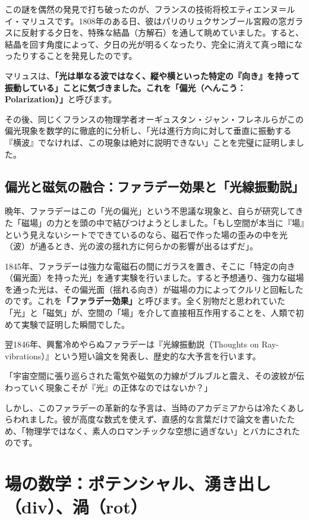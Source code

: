 この謎を偶然の発見で打ち破ったのが、フランスの技術将校エティエンヌ＝ルイ・マリュスです。1808年のある日、彼はパリのリュクサンブール宮殿の窓ガラスに反射する夕日を、特殊な結晶（方解石）を通して眺めていました。すると、結晶を回す角度によって、夕日の光が明るくなったり、完全に消えて真っ暗になったりすることを発見したのです。

マリュスは、\textbf{「光は単なる波ではなく、縦や横といった特定の『向き』を持って振動している」ことに気づきました。これを「偏光（へんこう：Polarization）」}と呼びます。

その後、同じくフランスの物理学者オーギュスタン・ジャン・フレネルらがこの偏光現象を数学的に徹底的に分析し、「光は進行方向に対して垂直に振動する『横波』でなければ、この現象は絶対に説明できない」ことを完璧に証明しました。

\subsection{偏光と磁気の融合：ファラデー効果と「光線振動説」}

晩年、ファラデーはこの「光の偏光」という不思議な現象と、自らが研究してきた「磁場」の力とを頭の中で結びつけようとしました。「もし空間が本当に『場』という見えないシートでできているのなら、磁石で作った場の歪みの中を光（波）が通るとき、光の波の揺れ方に何らかの影響が出るはずだ」。

1845年、ファラデーは強力な電磁石の間にガラスを置き、そこに「特定の向き（偏光面）を持った光」を通す実験を行いました。すると予想通り、強力な磁場を通った光は、その偏光面（揺れる向き）が磁場の力によってクルリと回転したのです。これを\textbf{「ファラデー効果」}と呼びます。全く別物だと思われていた「光」と「磁気」が、空間の「場」を介して直接相互作用することを、人類で初めて実験で証明した瞬間でした。

翌1846年、興奮冷めやらぬファラデーは『光線振動説（Thoughts on Ray-vibrations）』という短い論文を発表し、歴史的な大予言を行います。

「宇宙空間に張り巡らされた電気や磁気の力線がブルブルと震え、その波紋が伝わっていく現象こそが『光』の正体なのではないか？」

しかし、このファラデーの革新的な予言は、当時のアカデミアからは冷たくあしらわれました。彼が高度な数式を使えず、直感的な言葉だけで論文を書いたため、「物理学ではなく、素人のロマンチックな空想に過ぎない」とバカにされたのです。

\section{場の数学：ポテンシャル、湧き出し（div）、渦（rot）}

